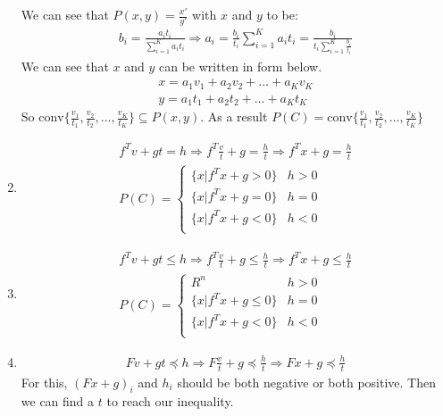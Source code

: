 \documentclass[a4paper]{article}
\begin{document}
\begin{latin}
\begin{enumerate}
	We can see that $ P(x,y) = \frac{x'}{y'} $ with $ x $ and $ y $ to be:
	\begin{gather*}
		b_{i} = \frac{a_{i} t_{i}}{\sum_{i=1}^{K} a_{i} t_{i}} \Rightarrow a_{i} = \frac{b_{i}}{t_{i}} \sum_{i=1}^{K} a_{i} t_{i} = \frac{b_{i}}{t_{i} \sum_{i=1}^{K} \frac{b_{i}}{ t_{i}} }
	\end{gather*}
	We can see that $ x $ and $ y $ can be written in form below.
	\begin{gather*}
		x = a_{1} v_{1} + a_{2} v_{2} + \dots +  a_{K} v_{K} 
		\\
		y = a_{1} t_{1} + a_{2} t_{2} + \dots +  a_{K} t_{K} 
	\end{gather*}
	So  $ \text{conv}\{\frac{v_{1}}{t_{1}}, \frac{v_{2}}{t_{2}}, \dots , \frac{v_{K}}{t_{K}} \}  \subseteq P(x,y) $. 
	As a result  $ P(C) = \text{conv}\{\frac{v_{1}}{t_{1}}, \frac{v_{2}}{t_{2}}, \dots , \frac{v_{K}}{t_{K}} \} $
	\item 
	\begin{gather*}
		f^{T} v + gt = h \Rightarrow f^{T} \frac{v}{t} + g = \frac{h}{t} \Rightarrow f^{T} x + g = \frac{h}{t} 
		\\
		P(C) = \begin{cases}
			\{x | f^{T} x + g > 0\} & h>0 \\
			\{x | f^{T} x + g = 0\} & h=0 \\
			\{x | f^{T} x + g < 0\} & h<0 \\
		\end{cases}
	\end{gather*}
	\item 
	\begin{gather*}
		f^{T} v + gt \leq h \Rightarrow f^{T} \frac{v}{t} + g \leq \frac{h}{t} \Rightarrow f^{T} x + g \leq \frac{h}{t} 
		\\
		P(C) = \begin{cases}
			R^{n} & h>0 \\
			\{x | f^{T} x + g \leq 0\} & h=0 \\
			\{x | f^{T} x + g < 0\} & h<0 \\
		\end{cases}
	\end{gather*}
	\item 
	\begin{gather*}
		Fv + gt \preceq h \Rightarrow F \frac{v}{t} + g \preceq \frac{h}{t} \Rightarrow Fx + g \preceq \frac{h}{t} 
	\end{gather*}
	For this, $ (Fx + g)_{i} $ and $ h_{i} $ should be both negative or both positive. Then we can find a $ t $ to reach our inequality.

\end{enumerate}
\end{latin}
\end{document}
